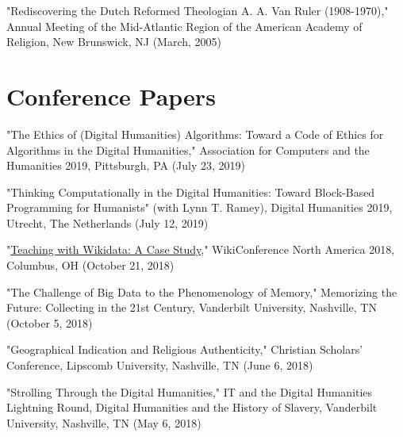 \documentclass[10pt]{res} %
\begin{document}
\begin{resume}
\begin{hangparas}{.25in}{1}"Rediscovering the Dutch Reformed Theologian A. A. Van Ruler (1908-1970)," Annual Meeting of the Mid-Atlantic Region of the American Academy of Religion, New Brunswick, NJ (March, 2005)\end{hangparas}

\section{Conference Papers}

\begin{hangparas}{.25in}{1}"The Ethics of (Digital Humanities) Algorithms: Toward a Code of Ethics for Algorithms in the Digital Humanities," Association for Computers and the Humanities 2019, Pittsburgh, PA (July 23, 2019)\end{hangparas}

\begin{hangparas}{.25in}{1}"Thinking Computationally in the Digital Humanities: Toward Block-Based Programming for Humanists" (with Lynn T. Ramey), Digital Humanities 2019, Utrecht, The Netherlands (July 12, 2019)\end{hangparas}

\begin{hangparas}{.25in}{1}"\href{https://commons.wikimedia.org/wiki/File:Teaching_with_Wikidata-A_Case_Study.pdf}{Teaching with Wikidata: A Case Study}," WikiConference North America 2018, Columbus, OH (October 21, 2018)\end{hangparas}

\begin{hangparas}{.25in}{1}"The Challenge of Big Data to the Phenomenology of Memory," Memorizing the Future: Collecting in the 21st Century, Vanderbilt University, Nashville, TN (October 5, 2018)\end{hangparas}

\begin{hangparas}{.25in}{1}"Geographical Indication and Religious Authenticity," Christian Scholars’ Conference, Lipscomb University, Nashville, TN (June 6, 2018)\end{hangparas}

\begin{hangparas}{.25in}{1}"Strolling Through the Digital Humanities," IT and the Digital Humanities Lightning Round, Digital Humanities and the History of Slavery, Vanderbilt University, Nashville, TN (May 6, 2018)\end{hangparas}


\end{resume}
\end{document}
